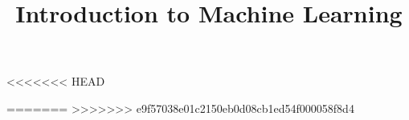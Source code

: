 

\newcommand{\titlefigure}{figure/eval_ofit_1}
\newcommand{\learninggoals}{
\item Understand what overfitting is and why it is a problem
\item Understand how to avoid overfitting}


\title{Introduction to Machine Learning}
\date{}



<<<<<<< HEAD





=======
>>>>>>> e9f57038e01c2150eb0d08cb1ed54f000058f8d4



